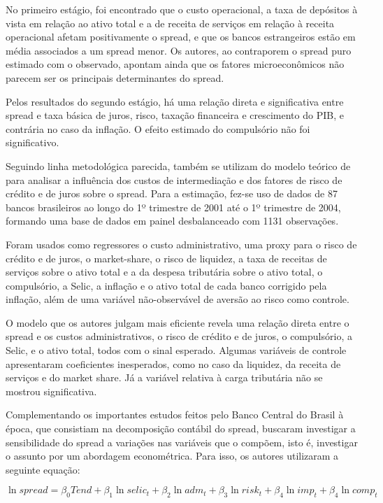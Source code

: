 \documentclass[a4paper,
               article,
               12pt,
               openany,
               oneside,
               english,
               brazil]{abntex2}
\numberwithin{equation}{section}
\begin{document}
    No primeiro estágio, foi encontrado que o custo operacional, a taxa de depósitos à vista em relação ao ativo total e a de receita de serviços em relação à receita operacional afetam positivamente o spread, e que os bancos estrangeiros estão em média associados a um spread menor. Os autores, ao contraporem o spread puro estimado com o observado, apontam ainda que os fatores microeconômicos não parecem ser os principais determinantes do spread.
    
    Pelos resultados do segundo estágio, há uma relação direta e significativa entre spread e taxa básica de juros, risco, taxação financeira e crescimento do PIB, e contrária no caso da inflação. O efeito estimado do compulsório não foi significativo.

    Seguindo linha metodológica parecida, \textcite{bignotto06} também se utilizam do modelo teórico de \textcite{hoesaunders} para analisar a influência dos custos de intermediação e dos fatores de risco de crédito e de juros sobre o spread. Para a estimação, fez-se uso de dados de 87 bancos brasileiros ao longo do 1º trimestre de 2001 até o 1º trimestre de 2004, formando uma base de dados em painel desbalanceado com 1131 observações.
    
    Foram usados como regressores o custo administrativo, uma proxy para o risco de crédito e de juros, o market-share, o risco de liquidez, a taxa de receitas de serviços sobre o ativo total e a da despesa tributária sobre o ativo total, o compulsório, a Selic, a inflação e o ativo total de cada banco corrigido pela inflação, além de uma variável não-observável de aversão ao risco como controle. 
    
    O modelo que os autores julgam mais eficiente revela uma relação direta entre o spread e os custos administrativos, o risco de crédito e de juros, o compulsório, a Selic, e o ativo total, todos com o sinal esperado. Algumas variáveis de controle apresentaram coeficientes inesperados, como no caso da liquidez, da receita de serviços e do market share. Já a variável relativa à carga tributária não se mostrou significativa.

    Complementando os importantes estudos feitos pelo Banco Central do Brasil à época, que consistiam na decomposição contábil do spread, \textcite{nakane02} buscaram investigar a sensibilidade do spread a variações nas variáveis que o compõem, isto é, investigar o assunto por um abordagem econométrica. Para isso, os autores utilizaram a seguinte equação:

    $$\ln spread = \beta_0Tend + \beta_1\ln selic_t + \beta_2\ln adm_t + \beta_3\ln risk_t + \beta_4\ln imp_t + \beta_4\ln comp_t$$
\end{document}
